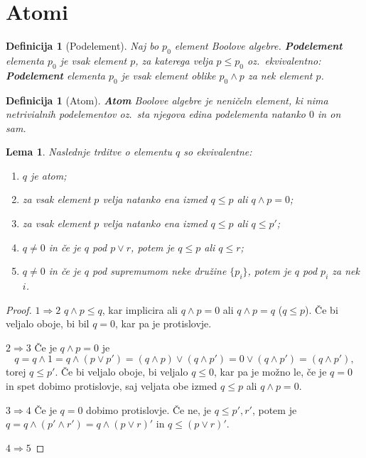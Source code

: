 \documentclass{amsart}
\newtheorem{lema}[izrek]{Lema}
\newtheorem{definicija}[izrek]{Definicija}
\begin{document}
\section{Atomi}

\begin{definicija}[Podelement]
    Naj bo $p_0$ element Boolove algebre. \textbf{Podelement} elementa $p_0$ je vsak element
    \(p\), za katerega velja \(p \leq p_0\) oz.~ekvivalentno: \textbf{Podelement} elementa $p_0$ je vsak element oblike
    \(p_0 \wedge p\) za nek element \(p\).
\end{definicija}

\begin{definicija}[Atom]
    {\bf Atom} Boolove algebre je neničeln element, ki nima netrivialnih podelementov oz.\ sta njegova edina podelementa natanko $0$ in on sam.
\end{definicija}

\begin{lema}
    Naslednje trditve o elementu $q$ so ekvivalentne:
    \begin{enumerate}
        \item $q$ je atom;
        \item za vsak element $p$ velja natanko ena izmed \(q \leq p\) ali \(q \wedge p = 0\);
        \item za vsak element $p$ velja natanko ena izmed \(q \leq p\) ali \(q \leq p'\);
        \item \(q \neq 0\) in če je $q$ pod \(p \vee r\), potem je \(q \leq p\) ali \(q \leq r\);
        \item \(q \neq 0\) in če je $q$ pod supremumom neke družine \(\{p_i\}\), potem je \(q\) pod \(p_i\) za nek \(i\).
    \end{enumerate}
\end{lema}

\begin{proof} 
    \(1 \Rightarrow 2\) \(q \wedge p \leq q\), kar implicira ali
    \(q \wedge p = 0\) ali \(q \wedge p = q\) (\(q \leq p\)). Če bi veljalo oboje, bi bil
    $q = 0$, kar pa je protislovje. 

    \(2 \Rightarrow 3\) Če je \(q \wedge p = 0\) je 
    \[q = q \wedge 1 = q \wedge \left(p \vee p'\right) = \left(q \wedge p\right)
    \vee \left(q \wedge p'\right) = 0 \vee \left(q \wedge p'\right) = 
    \left(q \wedge p'\right),\]
    torej \(q \leq p'\). Če bi veljalo oboje, bi veljalo \(q \leq 0\), kar pa je možno le, če 
    je $q = 0$ in spet dobimo protislovje, saj veljata obe izmed \(q \leq p\) ali \(q \wedge p = 0\).

    \(3 \Rightarrow 4\) Če je \(q = 0\) dobimo protislovje. Če ne, je \(q \leq p', r'\), potem je 
    \(q = q \wedge (p' \wedge r') = q \wedge (p \vee r)'\) in \(q \leq (p \vee r)'\).

    \(4 \Rightarrow 5\)

\end{proof}
\end{document}
